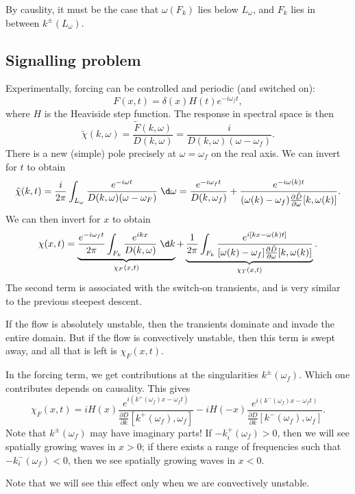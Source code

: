 \documentclass[a4paper]{article}
\begin{document}

By causlity, it must be the case that $\omega(F_k)$ lies below $L_\omega$, and $F_k$ lies in between $k^{\pm}(L_\omega)$.

\subsection{Signalling problem}
Experimentally, forcing can be controlled and periodic (and switched on):
\[
  F(x, t) = \delta(x) H(t) e^{-i\omega_f t},
\]
where $H$ is the Heaviside step function. The response in spectral space is then
\[
  \tilde{\chi}(k, \omega) = \frac{\tilde{F}(k, \omega)}{D(k, \omega)} = \frac{i}{D(k, \omega)(\omega - \omega_f)}.
\]
There is a new (simple) pole precisely at $\omega = \omega_f$ on the real axis. We can invert for $t$ to obtain
\[
  \tilde{\chi}(k, t) = \frac{i}{2\pi} \int_{L_\omega} \frac{e^{-i\omega t}}{D(k, \omega) (\omega - \omega_F)}\;\d \omega = \frac{e^{-i\omega_f t}}{D(k, \omega_f)} + \frac{e^{-i\omega(k) t}}{(\omega(k) - \omega_f) \frac{\partial \tilde{D}}{\partial \omega}[k, \omega(k)]}.
\]
We can then invert for $x$ to obtain
\[
  \chi(x, t) = \underbrace{\frac{e^{-i\omega_f t}}{2\pi} \int_{F_k} \frac{e^{ikx}}{D(k, \omega)}\;\d k}_{\chi_F(x, t)} + \underbrace{\frac{1}{2\pi} \int_{F_k} \frac{e^{i[kx - \omega(k) t]}}{[\omega(k) - \omega_f] \frac{\partial \tilde{D}}{\partial \omega} [k, \omega(k)]}}_{\chi_T(x, t)}.
\]
The second term is associated with the switch-on transients, and is very similar to the previous steepest descent.

If the flow is absolutely unstable, then the transients dominate and invade the entire domain. But if the flow is convectively unstable, then this term is swept away, and all that is left is $\chi_F(x, t)$.

In the forcing term, we get contributions at the singularities $k^{\pm}(\omega_f)$. Which one contributes depends on causality. This gives
\[
  \chi_F(x, t) = iH(x) \frac{e^{i(k^+(\omega_f)x - \omega_f t)}}{\frac{\partial D}{\partial k} [k^+(\omega_f), \omega_f]} - i H(-x) \frac{e^{i(k^-(\omega_f) x - \omega_f t)}}{\frac{\partial D}{\partial k} [k^-(\omega_f), \omega_f]}.
\]
Note that $k^{\pm}(\omega_f)$ may have imaginary parts! If $-k_i^+(\omega_f) > 0$, then we will see spatially growing waves in $x > 0$; if there exists a range of frequencies such that $-k_i^-(\omega_f) < 0$, then we see spatially growing waves in $x < 0$.

Note that we will see this effect only when we are convectively unstable.
\end{document}

